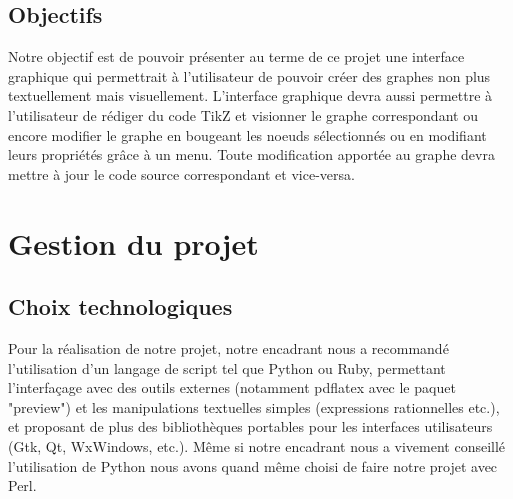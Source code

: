\documentclass[a4paper]{report}
\begin{document}
  \section{Objectifs}
Notre objectif est de pouvoir présenter au terme de ce projet une interface graphique qui permettrait à l'utilisateur de pouvoir créer des graphes non plus textuellement mais visuellement. L'interface graphique devra aussi permettre à l'utilisateur de rédiger du code TikZ et visionner le graphe correspondant ou encore modifier le graphe en bougeant les noeuds sélectionnés ou en modifiant leurs propriétés grâce à un menu.
Toute modification apportée au graphe devra mettre à jour le code source correspondant et vice-versa. 
  \chapter {Gestion du projet}
  \section{Choix technologiques}
  Pour la réalisation de notre projet, notre encadrant nous a recommandé l'utilisation d'un langage de script tel que Python ou Ruby, permettant l'interfaçage avec des outils externes (notamment pdflatex avec le paquet "preview") et les manipulations textuelles simples (expressions rationnelles etc.), et proposant de plus des bibliothèques portables pour les interfaces utilisateurs (Gtk, Qt, WxWindows, etc.). Même si notre encadrant nous a vivement conseillé l'utilisation de Python nous avons quand même choisi de faire notre projet avec Perl. 
\end{document}
